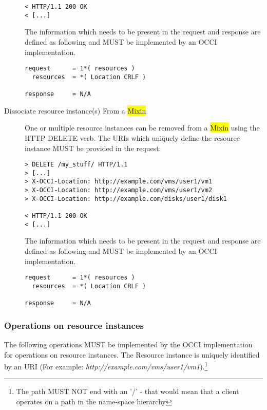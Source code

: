 \documentclass[10pt,a4paper]{article}
\begin{document}
\begin{description}
\begin{verbatim}
< HTTP/1.1 200 OK
< [...]
\end{verbatim}

    The information which needs to be present in the request and
    response are defined as following and MUST be implemented by an
    OCCI implementation.

\begin{verbatim}
request      = 1*( resources )
  resources  = *( Location CRLF )

response     = N/A
\end{verbatim}

  \item[Dissociate resource instance(s) From a \hl{Mixin}] One or
    multiple resource instances can be removed from a \hl{Mixin} using
    the HTTP DELETE verb. The URIs which uniquely define the resource
    instance MUST be provided in the request:

\begin{verbatim}
> DELETE /my_stuff/ HTTP/1.1
> [...]
> X-OCCI-Location: http://example.com/vms/user1/vm1
> X-OCCI-Location: http://example.com/vms/user1/vm2
> X-OCCI-Location: http://example.com/disks/user1/disk1

< HTTP/1.1 200 OK
< [...]
\end{verbatim}

    The information which needs to be present in the request and
    response are defined as following and MUST be implemented by an
    OCCI implementation.

\begin{verbatim}
request      = 1*( resources )
  resources  = *( Location CRLF )

response     = N/A
\end{verbatim}

\end{description}

\subsubsection{Operations on resource instances}
\label{sec:ops_on_instances}
The following operations MUST be implemented by the OCCI
implementation for operations on resource instances. The Resource
instance is uniquely identified by an URI (For example:
\emph{http://example.com/vms/user1/vm1}).\footnote{The path MUST NOT
  end with an '/' - that would mean that a client operates on a path
  in the name-space hierarchy}
\end{document}

